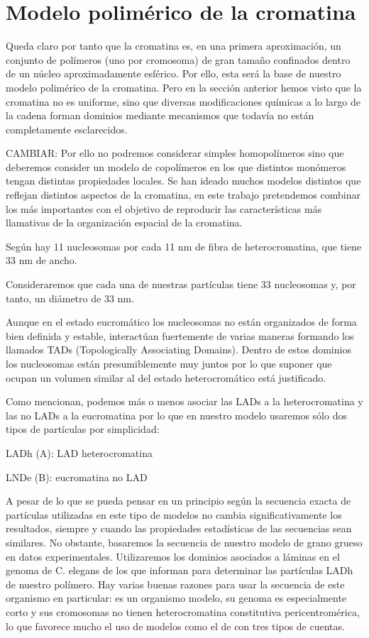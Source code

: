 \section{Modelo polimérico de la cromatina}

Queda claro por tanto que la cromatina es, en una primera aproximación, un conjunto de polímeros (uno por cromosoma) de gran tamaño confinados dentro de un núcleo aproximadamente esférico. Por ello, esta será la base de nuestro modelo polimérico de la cromatina. Pero en la sección anterior hemos visto que la cromatina no es uniforme, sino que diversas modificaciones químicas a lo largo de la cadena forman dominios mediante mecanismos que todavía no están completamente esclarecidos.

CAMBIAR: Por ello no podremos considerar simples homopolímeros sino que deberemos consider un modelo de copolímeros en los que distintos monómeros tengan distintas propiedades locales. Se han ideado muchos modelos distintos que reflejan distintos aspectos de la cromatina, en este trabajo pretendemos combinar los más importantes con el objetivo de reproducir las características más llamativas de la organización espacial de la cromatina.

Según \cite{Robinson2006} hay 11 nucleosomas por cada 11 nm de fibra de heterocromatina, que tiene 33 nm de ancho.

Consideraremos que cada una de nuestras partículas tiene 33 nucleosomas y, por tanto, un diámetro de 33 nm.

Aunque en el estado eucromático los nucleosomas no están organizados de forma bien definida y estable, interactúan fuertemente de varias maneras formando los llamados TADs (Topologically Associating Domains). Dentro de estos dominios los nucleosomas están presumiblemente muy juntos por lo que suponer que ocupan un volumen similar al del estado heterocromático está justificado.

Como \cite{Bajpai2021} mencionan, podemos más o menos asociar las LADs a la heterocromatina y las no LADs a la eucromatina por lo que en nuestro modelo usaremos sólo dos tipos de partículas por simplicidad:

LADh (A): LAD heterocromatina

LNDe (B): eucromatina no LAD

A pesar de lo que se pueda pensar en un principio según \cite{Bajpai2021} la secuencia exacta de partículas utilizadas en este tipo de modelos no cambia significativamente los resultados, siempre y cuando las propiedades estadísticas de las secuencias sean similares. No obstante, basaremos la secuencia de nuestro modelo de grano grueso en datos experimentales. Utilizaremos los dominios asociados a láminas en el genoma de C. elegans de los que informan \cite{Ho2014} para determinar las partículas LADh de nuestro polímero. Hay varias buenas razones para usar la secuencia de este organismo en particular: es un organismo modelo, su genoma es especialmente corto y sus cromosomas no tienen heterocromatina constitutiva pericentromérica, lo que favorece mucho el uso de modelos como el de \cite{Falk2019} con tres tipos de cuentas.

